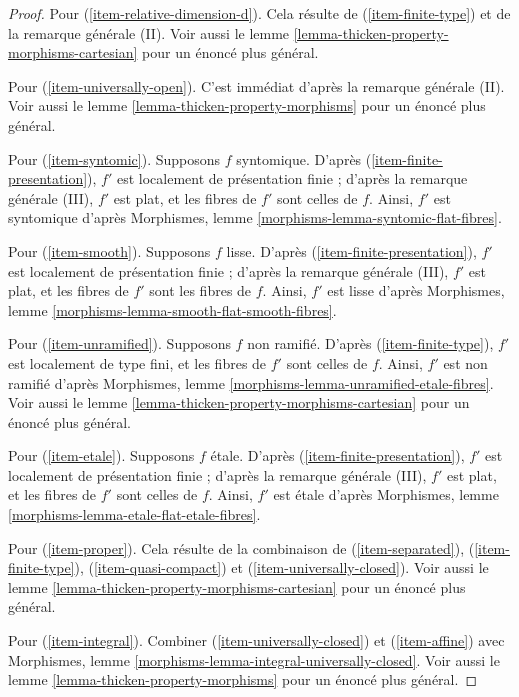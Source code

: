 \begin{proof}
\medskip\noindent
Pour (\ref{item-relative-dimension-d}). Cela résulte de (\ref{item-finite-type})
et de la remarque générale (II). Voir aussi
le lemme \ref{lemma-thicken-property-morphisms-cartesian}
pour un énoncé plus général.

\medskip\noindent
Pour (\ref{item-universally-open}). C'est immédiat d'après la remarque générale (II). Voir aussi
le lemme \ref{lemma-thicken-property-morphisms} pour un énoncé plus général.

\medskip\noindent
Pour (\ref{item-syntomic}). Supposons $f$ syntomique. D'après
(\ref{item-finite-presentation}), $f'$ est localement de présentation finie ;
d'après la remarque générale (III), $f'$ est plat, et les fibres de $f'$ sont celles
de $f$. Ainsi, $f'$ est syntomique d'après
Morphismes, lemme \ref{morphisms-lemma-syntomic-flat-fibres}.

\medskip\noindent
Pour (\ref{item-smooth}). Supposons $f$ lisse. D'après
(\ref{item-finite-presentation}), $f'$ est localement de présentation finie ;
d'après la remarque générale (III), $f'$ est plat, et les fibres de $f'$ sont les
fibres de $f$. Ainsi, $f'$ est lisse d'après
Morphismes, lemme \ref{morphisms-lemma-smooth-flat-smooth-fibres}.

\medskip\noindent
Pour (\ref{item-unramified}). Supposons $f$ non ramifié. D'après
(\ref{item-finite-type}), $f'$ est localement de type fini,
et les fibres de $f'$ sont celles de $f$.
Ainsi, $f'$ est non ramifié d'après
Morphismes, lemme \ref{morphisms-lemma-unramified-etale-fibres}. Voir aussi
le lemme \ref{lemma-thicken-property-morphisms-cartesian}
pour un énoncé plus général.

\medskip\noindent
Pour (\ref{item-etale}). Supposons $f$ étale. D'après
(\ref{item-finite-presentation}), $f'$ est localement de présentation finie ;
d'après la remarque générale (III), $f'$ est plat, et les fibres de $f'$ sont celles
de $f$. Ainsi, $f'$ est étale d'après
Morphismes, lemme \ref{morphisms-lemma-etale-flat-etale-fibres}.

\medskip\noindent
Pour (\ref{item-proper}). Cela résulte de la combinaison de
(\ref{item-separated}), (\ref{item-finite-type}), (\ref{item-quasi-compact})
et (\ref{item-universally-closed}). Voir aussi
le lemme \ref{lemma-thicken-property-morphisms-cartesian}
pour un énoncé plus général.

\medskip\noindent
Pour (\ref{item-integral}). Combiner (\ref{item-universally-closed}) et
(\ref{item-affine}) avec
Morphismes, lemme \ref{morphisms-lemma-integral-universally-closed}. Voir aussi
le lemme \ref{lemma-thicken-property-morphisms} pour un énoncé plus général.


\end{proof}
